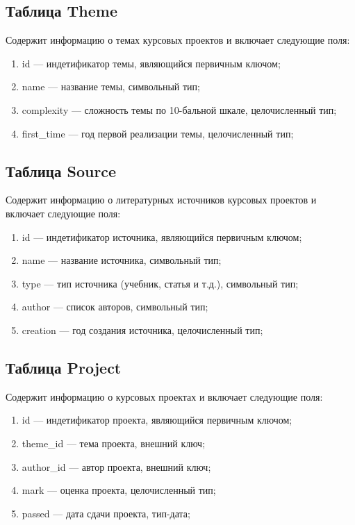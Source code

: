\subsection*{Таблица Theme}

Содержит информацию о темах курсовых проектов и включает следующие поля:

\begin{enumerate}
	\item id --- индетификатор темы, являющийся первичным ключом;
	\item name --- название темы, символьный тип;
	\item complexity --- сложность темы по 10-бальной шкале, целочисленный тип;
	\item first\_time --- год первой реализации темы, целочисленный тип;
\end{enumerate}

\subsection*{Таблица Source}

Содержит информацию о литературных источников курсовых проектов и включает следующие поля:

\begin{enumerate}
	\item id --- индетификатор источника, являющийся первичным ключом;
	\item name --- название источника, символьный тип;
	\item type --- тип источника (учебник, статья и т.д.), символьный тип;
	\item author --- список авторов, символьный тип;
	\item creation --- год создания источника, целочисленный тип;
\end{enumerate}

\subsection*{Таблица Project}

Содержит информацию о курсовых проектах и включает следующие поля:

\begin{enumerate}
	\item id --- индетификатор проекта, являющийся первичным ключом;
	\item theme\_id --- тема проекта, внешний ключ;
	\item author\_id --- автор проекта, внешний ключ;
	\item mark --- оценка проекта, целочисленный тип;
	\item passed --- дата сдачи проекта, тип-дата;
\end{enumerate}


